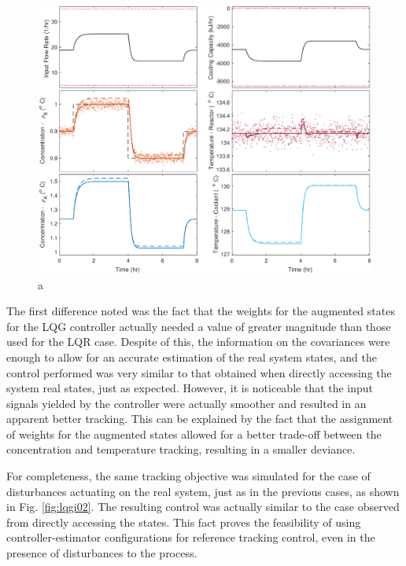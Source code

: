 \documentclass[a4paper,11pt]{book}
\numberwithin{figure}{chapter}
\numberwithin{equation}{chapter}
\numberwithin{table}{chapter}
\theoremstyle{definition}
\begin{document}
\begin{figure}[ht] \centering
	\includegraphics[width=\textwidth]{chapter7/lqgi01}
	\caption{a}
	\label{fig:lqgi01}
\end{figure}

The first difference noted was the fact that the weights for the augmented states for the LQG controller actually needed a value of greater magnitude than those used for the LQR case. Despite of this, the information on the covariances were enough to allow for an accurate estimation of the real system states, and the control performed was very similar to that obtained when directly accessing the system real states, just as expected. However, it is noticeable that the input signals yielded by the controller were actually smoother and resulted in an apparent better tracking. This can be explained by the fact that the assignment of weights for the augmented states allowed for a better trade-off between the concentration and temperature tracking, resulting in a smaller deviance.

For completeness, the same tracking objective was simulated for the case of disturbances actuating on the real system, just as in the previous cases, as shown in Fig. \ref{fig:lqgi02}. The resulting control was actually similar to the case observed from directly accessing the states. This fact proves the feasibility of using controller-estimator configurations for reference tracking control, even in the presence of disturbances to the process. 
\end{document}
